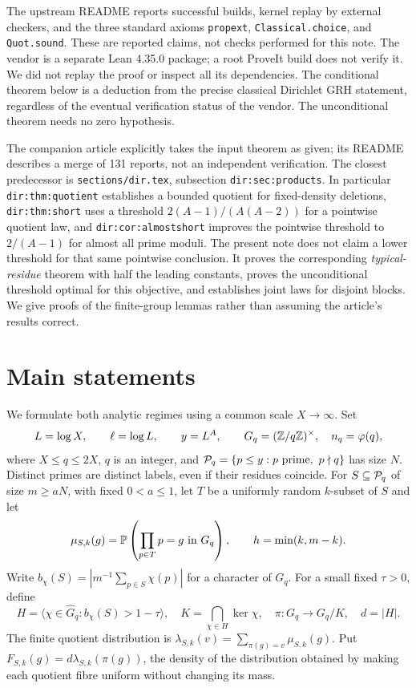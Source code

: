 \documentclass[11pt]{article}
\theoremstyle{remark}\newtheorem{remark}[theorem]{Remark}
\begin{document}
The upstream README reports successful builds, kernel replay by external checkers, and the three standard axioms \texttt{propext}, \texttt{Classical.choice}, and \texttt{Quot.sound}. These are reported claims, not checks performed for this note. The vendor is a separate Lean 4.35.0 package; a root ProveIt build does not verify it. We did not replay the proof or inspect all its dependencies. The conditional theorem below is a deduction from the precise classical Dirichlet GRH statement, regardless of the eventual verification status of the vendor. The unconditional theorem needs no zero hypothesis.

The companion article \cite{merged} explicitly takes the input theorem as given; its README describes a merge of 131 reports, not an independent verification. The closest predecessor is \texttt{sections/dir.tex}, subsection \texttt{dir:sec:products}. In particular \texttt{dir:thm:quotient} establishes a bounded quotient for fixed-density deletions, \texttt{dir:thm:short} uses a threshold $2(A-1)/(A(A-2))$ for a pointwise quotient law, and \texttt{dir:cor:almostshort} improves the pointwise threshold to $2/(A-1)$ for almost all prime moduli. The present note does not claim a lower threshold for that same pointwise conclusion. It proves the corresponding \emph{typical-residue} theorem with half the leading constants, proves the unconditional threshold optimal for this objective, and establishes joint laws for disjoint blocks. We give proofs of the finite-group lemmas rather than assuming the article's results correct.

\section{Main statements}
\label{sec:main}
We formulate both analytic regimes using a common scale $X\to\infty$. Set
\[
 L=\log X,\qquad \ell=\log L,\qquad y=L^A,\qquad
 G_q=(\mathbb Z/q\mathbb Z)^\times,\quad n_q=\varphi(q),
\]
where $X\le q\le2X$, $q$ is an integer, and $\mathcal P_q=\{p\le y:p\text{ prime},\ p\nmid q\}$ has size $N$. Distinct primes are distinct labels, even if their residues coincide. For $S\subseteq\mathcal P_q$ of size $m\ge aN$, with fixed $0<a\le1$, let $T$ be a uniformly random $k$-subset of $S$ and let
\[
 \mu_{S,k}(g)=\mathbb P\left(\prod_{p\in T}p=g\text{ in }G_q\right),\qquad h=\min(k,m-k).
\]
Write $b_\chi(S)=|m^{-1}\sum_{p\in S}\chi(p)|$ for a character of $G_q$. For a small fixed $\tau>0$, define
\[
 H=\langle\chi\in\widehat G_q:b_\chi(S)>1-\tau\rangle,
 \quad K=\bigcap_{\chi\in H}\ker\chi,
 \quad \pi:G_q\to G_q/K,\quad d=|H|.
\]
The finite quotient distribution is $\lambda_{S,k}(v)=\sum_{\pi(g)=v}\mu_{S,k}(g)$. Put $F_{S,k}(g)=d\lambda_{S,k}(\pi(g))$, the density of the distribution obtained by making each quotient fibre uniform without changing its mass.
\end{document}
